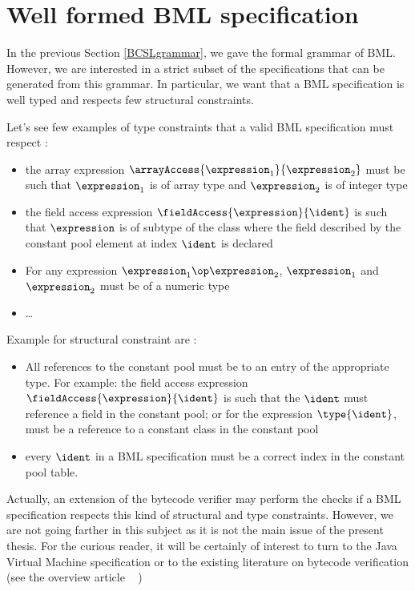 
\newcommand{\getType}{\mbox{\rm\textsf{getType}}}
\newcommand{\constType}{\mbox{\rm\textsf{constType}}}
\newcommand{\getClass}{\mbox{\rm\textsf{getClass}}}
\newcommand{\application}{\mbox{\rm\textbf{CLS}}}
 
\section{Well formed BML specification}
In the previous Section \ref{BCSLgrammar}, we gave the formal grammar of BML.
However, we are interested in a strict subset of 
the specifications that can be generated from this grammar. In particular, we want that a
BML specification is well typed and respects few structural constraints.


Let's see few examples of type constraints that  a valid BML specification must respect : 
\begin{itemize}
    \item  the array expression $\arrayAccess{\expression_1}{\expression_2}$ must be such that 
$\expression_1$ is of array type and $\expression_2$  is of integer type
    \item the field access expression  $\fieldAccess{\expression}{\ident}$ is such that $\expression$ is of subtype
    of the class where the field described by the constant pool element at index $\ident$ is declared
    \item For any expression $ \expression_1 \op \expression_2$,  $ \expression_1$ and $ \expression_2$ must be of
          a numeric type

    \item \ldots
\end{itemize}

Example for structural constraint are :
\begin{itemize}
    \item All references to the constant pool must be to an entry of the appropriate type. For example:
          the field access expression  $\fieldAccess{\expression}{\ident}$ is such that the
	  $\ident$ must reference a field in the constant pool; or for the expression $\type{\ident}$, \ident
	  must be a reference to a constant class in the constant pool
    \item every $\ident$ in a BML specification must be a correct index in the constant pool table. 
    
\end{itemize}

Actually, an extension of the bytecode verifier may perform the checks
 if a BML specification  respects this kind of structural and type constraints.
However, we are not going farther in this subject as it is not the main issue of the present thesis. 
For the curious reader, it will be certainly of interest to turn to the Java Virtual Machine specification  \cite{VMSpec} 
or to the existing literature on bytecode verification (see the overview article ~\cite{Ljbc} )
 







